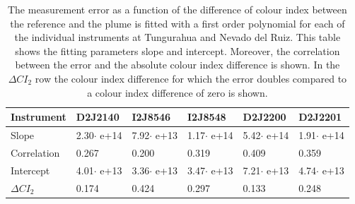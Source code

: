 \begin{table}[h]
	\centering
	\begin{tabular}{|p{2cm}|p{2cm}|p{2cm}|p{2cm}|p{2cm}|p{2cm}|}
		Instrument	&D2J2140&I2J8546& I2J8548&D2J2200&D2J2201\\
		\toprule
		Slope&2.30$\cdot$ e+14 &7.92$\cdot$ e+13 &1.17$\cdot$ e+14 &5.42$\cdot$ e+14&1.91$\cdot$ e+14\\
		\midrule
		Correlation&
		0.267&
		0.200&
		0.319&
		0.409&
		0.359\\
		\midrule
		Intercept&4.01$\cdot$ e+13&3.36$\cdot$ e+13&3.47$\cdot$ e+13& 7.21$\cdot$ e+13& 4.74$\cdot$ e+13\\
		\midrule
		$\Delta CI_{2}$&0.174&0.424&0.297&0.133&0.248\\
		\bottomrule
	\end{tabular}
	\caption{The  measurement error as a function of the difference of colour index between the reference and the plume is fitted with a first order polynomial for each of the individual instruments at Tungurahua and Nevado del Ruiz. This table shows the fitting parameters slope and intercept. Moreover, the correlation between the  error and the absolute colour index difference is shown. In the $\Delta CI_{2}$ row the colour index difference for which the error doubles compared to a colour index difference of zero is shown.}
	\label{tab:colidxcalc}
\end{table}

